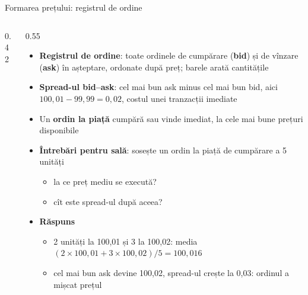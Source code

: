 \begin{frame}{Formarea prețului: registrul de ordine}
\itemsize{\footnotesize}
\begin{columns}[T]
\begin{column}{0.42\textwidth}
\centering
{}
\end{column}
\begin{column}{0.55\textwidth}
\begin{itemize}
    \item \textbf{Registrul de ordine}: toate ordinele de cumpărare (\textbf{bid}) și de vînzare (\textbf{ask}) în așteptare, ordonate după preț; barele arată cantitățile
    \item \textbf{Spread-ul bid--ask}: cel mai bun ask minus cel mai bun bid, aici $100{,}01 - 99{,}99 = 0{,}02$, costul unei tranzacții imediate
    \item Un \textbf{ordin la piață} cumpără sau vinde imediat, la cele mai bune prețuri disponibile
    \item \textbf{Întrebări pentru sală}: sosește un ordin la piață de cumpărare a 5 unități
    \begin{itemize}
        \item la ce preț mediu se execută?
        \item cît este spread-ul după aceea?
    \end{itemize}
    \pause
    \item \textbf{Răspuns}
    \begin{itemize}
        \item 2 unități la 100,01 și 3 la 100,02: media $(2 \times 100{,}01 + 3 \times 100{,}02)/5 = 100{,}016$
        \item cel mai bun ask devine 100,02, spread-ul crește la 0,03: ordinul a mișcat prețul
    \end{itemize}
\end{itemize}
\end{column}
\end{columns}
\end{frame}

